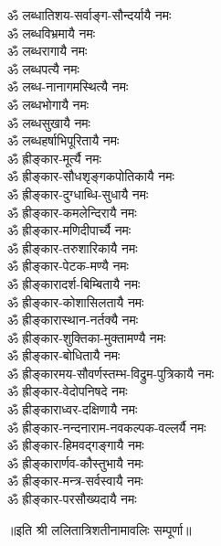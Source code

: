 \begin{multicols}{2}
\begin{flushleft}
ॐ लब्धातिशय-सर्वाङ्ग-सौन्दर्यायै नमः\\
ॐ लब्धविभ्रमायै नमः\\
ॐ लब्धरागायै नमः\\
ॐ लब्धपत्यै नमः\\
ॐ लब्ध-नानागमस्थित्यै नमः\\
ॐ लब्धभोगायै नमः\\
ॐ लब्धसुखायै नमः\\
ॐ लब्धहर्षाभिपूरितायै नमः\hfill {}\\
ॐ ह्रीङ्कार-मूर्त्यै नमः\\
ॐ ह्रीङ्कार-सौधशृङ्गकपोतिकायै नमः\\
ॐ ह्रीङ्कार-दुग्धाब्धि-सुधायै नमः\\
ॐ ह्रीङ्कार-कमलेन्दिरायै नमः\\
ॐ ह्रीङ्कार-मणिदीपार्च्यै नमः\\
ॐ ह्रीङ्कार-तरुशारिकायै नमः\\
ॐ ह्रीङ्कार-पेटक-मण्यै नमः\\
ॐ ह्रीङ्कारादर्श-बिम्बितायै नमः\\
ॐ ह्रीङ्कार-कोशासिलतायै नमः\\
ॐ ह्रीङ्कारास्थान-नर्तक्यै नमः\hfill {}\\
ॐ ह्रीङ्कार-शुक्तिका-मुक्तामण्यै नमः\\
ॐ ह्रीङ्कार-बोधितायै नमः\\
ॐ ह्रीङ्कारमय-सौवर्णस्तम्भ-विद्रुम-पुत्रिकायै नमः\\
ॐ ह्रीङ्कार-वेदोपनिषदे नमः\\
ॐ ह्रीङ्काराध्वर-दक्षिणायै नमः\\
ॐ ह्रीङ्कार-नन्दनाराम-नवकल्पक-वल्लर्यै नमः\\
ॐ ह्रीङ्कार-हिमवद्गङ्गायै नमः\\
ॐ ह्रीङ्कारार्णव-कौस्तुभायै नमः\\
ॐ ह्रीङ्कार-मन्त्र-सर्वस्वायै नमः\\
ॐ ह्रीङ्कार-परसौख्यदायै नमः\hfill {}\\
\end{flushleft}
\end{multicols}
\centerline{॥इति श्री ललितात्रिशतीनामावलिः सम्पूर्णा॥}
